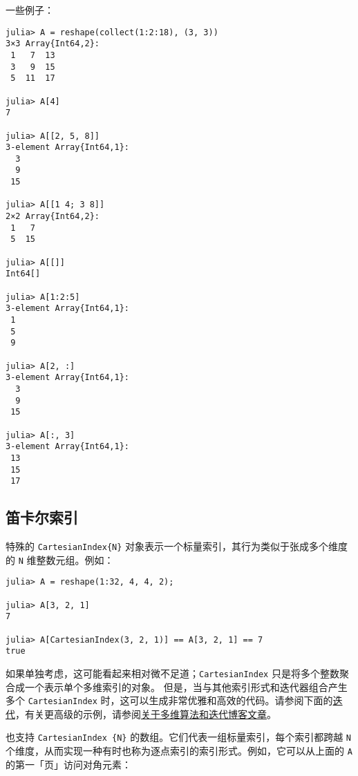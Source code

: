 一些例子：




\begin{verbatim}
julia> A = reshape(collect(1:2:18), (3, 3))
3×3 Array{Int64,2}:
 1   7  13
 3   9  15
 5  11  17

julia> A[4]
7

julia> A[[2, 5, 8]]
3-element Array{Int64,1}:
  3
  9
 15

julia> A[[1 4; 3 8]]
2×2 Array{Int64,2}:
 1   7
 5  15

julia> A[[]]
Int64[]

julia> A[1:2:5]
3-element Array{Int64,1}:
 1
 5
 9

julia> A[2, :]
3-element Array{Int64,1}:
  3
  9
 15

julia> A[:, 3]
3-element Array{Int64,1}:
 13
 15
 17
\end{verbatim}



\hypertarget{6884198732360978942}{}


\subsection{笛卡尔索引}



特殊的 \texttt{CartesianIndex\{N\}} 对象表示一个标量索引，其行为类似于张成多个维度的 \texttt{N} 维整数元组。例如：




\begin{verbatim}
julia> A = reshape(1:32, 4, 4, 2);

julia> A[3, 2, 1]
7

julia> A[CartesianIndex(3, 2, 1)] == A[3, 2, 1] == 7
true
\end{verbatim}



如果单独考虑，这可能看起来相对微不足道；\texttt{CartesianIndex} 只是将多个整数聚合成一个表示单个多维索引的对象。 但是，当与其他索引形式和迭代器组合产生多个 \texttt{CartesianIndex} 时，这可以生成非常优雅和高效的代码。请参阅下面的\hyperlink{13048041929642713791}{迭代}，有关更高级的示例，请参阅\href{https://julialang.org/blog/2016/02/iteration}{关于多维算法和迭代博客文章}。



也支持 \texttt{CartesianIndex \{N\}} 的数组。它们代表一组标量索引，每个索引都跨越 \texttt{N} 个维度，从而实现一种有时也称为逐点索引的索引形式。例如，它可以从上面的 \texttt{A} 的第一「页」访问对角元素：




